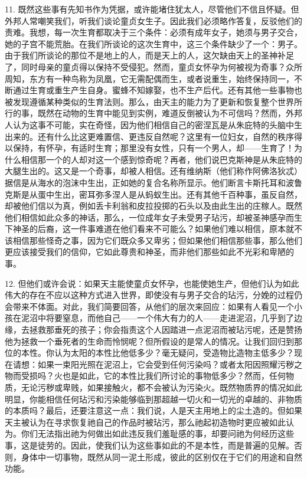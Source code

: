 11. 既然这些事有先知书作为凭据，或许能堵住犹太人，尽管他们不信且怀疑。但外邦人常嘲笑我们，听我们谈论童贞女生子。因此我们必须略作答复，反驳他们的责难。我想，每一次生育都取决于三个条件：必须有成年女子，她须与男子交合，她的子宫不能荒胎。在我们所谈论的这次生育中，这三个条件缺少了一个：男子。由于我们所谈论的那位不是地上的人，而是天上的人，这欠缺由天上的圣神补足了，同时母亲的童贞得以保持不受侵犯。然而，童贞女怀孕为何被视为奇事？众所周知，东方有一种鸟称为凤凰，它无需配偶而生，或者说重生，始终保持同一，不断通过生育或重生产生自身。蜜蜂不知嫁娶，也不生产后代。还有其他一些事物也被发现遵循某种类似的生育法则。那么，由天主的能力为了更新和恢复整个世界所行的事，既然在动物的生育中能见到实例，难道反倒被认为不可信吗？然而，外邦人认为这事不可能，实在奇怪，因为他们相信自己的密涅瓦是从朱庇特的头脑中生出来的。还有什么比这更难置信、更违反自然呢？这里有一位妇女，自然的秩序得以保持，有怀孕，有适时生育；那里没有女性，只有一个男人，却——生育了！为什么相信那一个的人却对这一个感到惊奇呢？再者，他们说巴克斯神是从朱庇特的大腿生出的。这又是一个奇事，却被人相信。还有维纳斯（他们称作阿佛洛狄忒）据信是从海水的泡沫中生出，正如她的复合名称所显示。他们断言卡斯托耳和波鲁克斯是从蛋中生出，密耳弥多涅人是从蚂蚁生出。还有其他千百种事，虽反自然，却被他们信以为真，例如丢卡利翁和皮拉投掷的石头以及由此生出的庄稼人。既然他们相信如此众多的神话，那么，一位成年女子未受男子玷污，却被圣神感孕而生下神圣的后裔，这一件事难道在他们看来不可能么？如果他们难以相信，原本就不该相信那些怪奇之事，因为它们既众多又卑劣；但如果他们相信那些事，那么他们更应该接受我们的信仰，它如此尊贵和神圣，而非他们那些如此不光彩和卑陋的事。\par

12. 但他们或许会说：如果天主能使童贞女怀孕，也能使她生产，但他们认为如此伟大的存在不应以这种方式进入世界，即使没有与男子交合的玷污，分娩的过程仍会带来不体面。对此，我们简要回答，从他们的层次来回应：如果有人看见一个小孩在泥沼中将要窒息，而他自己——一个伟大有力的人——走进泥沼，几乎到了边缘，去拯救那垂死的孩子；你会指责这个人因踏进一点泥沼而被玷污呢，还是赞扬他为拯救一个垂死者的生命而怜悯呢？但所假设的是常人的情况。让我们回归到那位的本性。你认为太阳的本性比他低多少？毫无疑问，受造物比造物主低多少？现在请想：如果一束阳光照在泥沼上，它会受到任何污染吗？或者太阳因照耀污秽之物而受损吗？火也是如此，它的本性比我们所讨论的事物低多少？然而，任何物质，无论污秽或卑贱，如果接触火，都不会被认为污染火。既然物质界的情况如此明显，你能相信任何玷污和污染能够临到那超越一切火和一切光的卓越的、非物质的本质吗？最后，还要注意这一点：我们说，人是天主用地上的尘土造的。但如果天主被认为在寻求恢复祂自己的作品时被玷污，那么祂起初造物时更应被如此认为。你们无法指出祂为何做出如此违反我们羞耻感的事，却要问祂为何经历这些事，这是徒劳的。因此，使我们认为这些事如此的不是本性，而是普遍的见解。否则，身体中一切事物，既然从同一泥土形成，彼此的区别仅在于它们的用途和自然功能。\par

